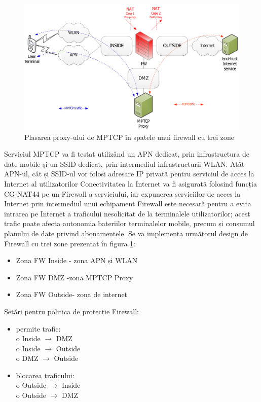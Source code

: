 \begin{figure}[h]
	\centering
	\includegraphics[scale=0.3]{figures/oro/oro_mptcp.png}
	\caption{Plasarea proxy-ului de MPTCP în spatele unui firewall cu trei zone}
    	\label{fig:oro_mptcp}
\end{figure}

Serviciul MPTCP va fi testat utilizând un APN dedicat, prin
infrastructura de date mobile și un SSID dedicat, prin intermediul
infrastructurii WLAN. Atât APN-ul, cât și SSID-ul vor folosi adresare
IP privată pentru serviciul de acces la Internet al utilizatorilor
Conectivitatea la Internet va fi asigurată folosind funcția CG-NAT44
pe un Firewall a serviciului, iar expunerea serviciilor de acces la
Internet prin intermediul unui echipament Firewall este necesară
pentru a evita intrarea pe Internet a traficului nesolicitat de la
terminalele utilizatorilor; acest trafic poate afecta autonomia
bateriilor terminalelor mobile, precum și consumul planului de date
privind abonamentele.  Se va implementa următorul design de Firewall
cu trei zone prezentat în figura \ref{fig:oro_mptcp}:
\begin{itemize}
 \item Zona FW Inside - zona APN și WLAN
 \item Zona FW DMZ -zona MPTCP Proxy
 \item Zona FW Outside- zona de internet
\end{itemize}
 
Setări pentru politica de protecție Firewall:
\begin{itemize}
 \item 	permite trafic: \\
o	Inside $\rightarrow$ DMZ\\
o	Inside  $\rightarrow$  Outside\\
o	DMZ  $\rightarrow$  Outside
\item blocarea traficului:\\
o	Outside   $\rightarrow$  Inside\\
o	Outside  $\rightarrow$  DMZ
\end{itemize}


